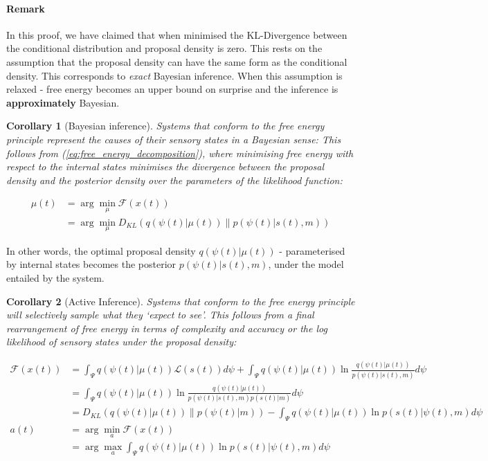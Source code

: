 \documentclass{article}
\newcommand{\refp}[1]{(\ref{#1})}
\newtheorem{corollary}{Corollary}
\begin{document}
\paragraph{Remark} In this proof, we have claimed that when minimised the KL-Divergence between the conditional distribution and proposal density is zero. This rests on the assumption that the proposal density can have the same form as the conditional density. This corresponds to \textit{exact} Bayesian inference. When this assumption is relaxed - free energy becomes an upper bound on surprise and the inference is \textbf{approximately} Bayesian. 

\begin{corollary}[Bayesian inference]\label{cor:bayesian_inference}
	Systems that conform to the free energy principle represent the causes of their sensory states in a Bayesian sense: This follows from \refp{eq:free_energy_decomposition}, where minimising free energy with respect to the internal states minimises the divergence between the proposal density and the posterior density over the parameters of the likelihood function:
	
	\begin{align*}
		\mu(t) & =\arg \min _\mu \mathcal{F}(x(t)) \\
		& =\arg \min _\mu D_{K L}(q(\psi(t) | \mu(t)) \| p(\psi(t) | s(t), m))
	\end{align*}
\end{corollary}

In other words, the optimal proposal density $q(\psi(t) | \mu(t))$ - parameterised by internal states becomes the posterior $p(\psi(t) | s(t), m)$, under the model entailed by the system.

\begin{corollary}[Active Inference]
	Systems that conform to the free energy principle will selectively sample what they `expect to see'. This follows from a final rearrangement of free energy in terms of complexity and accuracy or the log likelihood of sensory states under the proposal density:
	
\begin{align*}
	\mathcal{F}(x(t)) & =\int_{\Psi} q(\psi(t) | \mu(t)) \mathcal{L}(s(t)) d \psi+\int_{\Psi} q(\psi(t) | \mu(t)) \ln \frac{q(\psi(t) | \mu(t))}{p(\psi(t) | s(t), m)} d \psi \\
		& =\int_{\Psi} q(\psi(t) | \mu(t)) \ln \frac{q(\psi(t) | \mu(t))}{p(\psi(t) | s(t), m) p(s(t) | m)} d \psi \\
		& =D_{K L}(q(\psi(t) | \mu(t)) \| p(\psi(t) | m))-\int_{\Psi} q(\psi(t) | \mu(t)) \ln p(s(t) | \psi(t), m) d \psi \\
		a(t) & =\arg \min _a \mathcal{F}(x(t)) \\
		& =\arg \max _a \int_{\Psi} q(\psi(t) | \mu(t)) \ln p(s(t) | \psi(t), m) d \psi
\end{align*}

\end{corollary}
\end{document}
